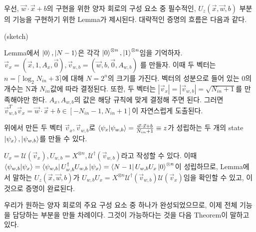 우선, \(\vec{w}\cdot \vec{x} + b\)의 구현을 위한 양자 회로의 구성 요소 중 필수적인, \(U_z(\vec{x},\vec{w},b)\) 부분의 기능을 구현하기 위한 Lemma가 제시된다.
대략적인 증명의 흐름은 다음과 같다.

\begin{pf}(sketch)

Lemma에서 \(\ket{0}, \ket{N-1}\)은 각각 \(\ket{0}^{\otimes n}, \ket{1}^{\otimes n}\)임을 기억하자.
\(\vec{v}_x = (\vec{x},1,A_x,\vec{0}), \vec{v}_{w,b} = (\vec{w},b,\vec{0},A_{w,b})\) 를 만들자.
이때 두 벡터는 \(n = \lceil\log_2{N_{in}+3}\rceil\)에 대해 \(N = 2^n\)의 크기를 가진다. 벡터의 성분으로 들어 있는 0의 개수는 N과 \(N_{in}\)값에 따라 결정된다.
또한, 두 벡터는 \(|\vec{v}_x| = |\vec{v}_{w,b}| = \sqrt{N_{in}+1}\)를 만족해야만 한다. \(A_x, A_{w,b}\)의 값은 해당 규칙에 맞게 결정해 주면 된다.
그러면 \(\vec{v}_{w,b}^T\vec{v}_{x} = \vec{w}\cdot\vec{x}+b \in [-N_{in}-1, N_{in}+1]\)이 자연스럽게 도출된다.


위에서 만든 두 벡터 \(\vec{v}_x, \vec{v}_{w,b}\)로 \(\bra{\psi_x}\ket{\psi_{w,b}} = \frac{\vec{w}\cdot\vec{x}+b}{N_{in}+1} \equiv z\)가 성립하는 두 개의 state \(\ket{\psi_{x}},\ket{\psi_{w,b}}\)를 만들 수 있다.

\(U_x = \mathcal{U}(\vec{v}_x), U_{w,b} = X^{\otimes n}, \mathcal{U}^\dag(\vec{v}_{w,b})\)라고 작성할 수 있다.
이때 \(\bra{\psi_{w,b}}\ket{\psi_x} = \bra{\psi_{w,b}}U_{w,b}^{\dag} U_{w,b}\ket{\psi_x} = \bra{N-1}U_{w,b}U_x\ket{0}^{\otimes n}\)이 성립하므로, Lemma에서 말하는 \(U_z(\vec{x},\vec{w},b)\)가 \(U_{w,b}U_x = X^{\otimes n}\mathcal{U}^\dag (\vec{v}_{w,b})\mathcal{U}(\vec{v}_x)\)임을 확인할 수 있고, 이것으로 증명이 완료된다.
\end{pf}

우리가 원하는 양자 회로의 주요 구성 요소 중 하나가 완성되었으므로, 이제 전체 기능을 담당하는 부분을 만들 차례이다. 그것이 가능하다는 것을 다음 Theorem이 말하고 있다.

